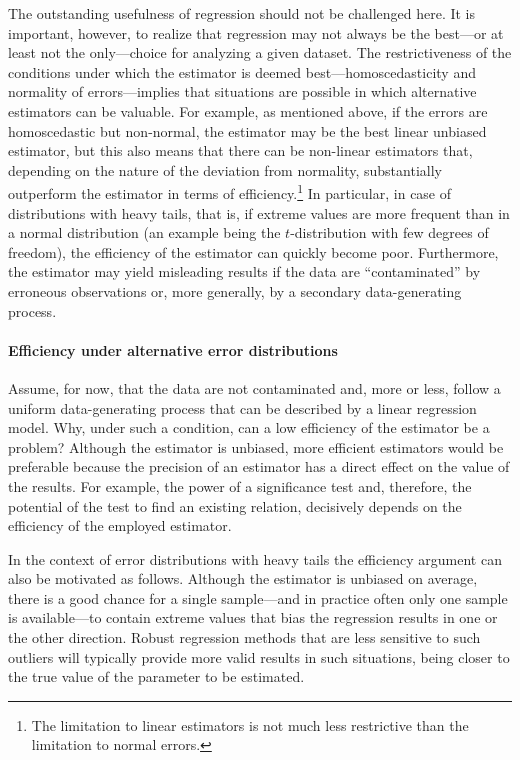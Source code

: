 The outstanding usefulness of  regression should not be challenged
here. It is important, however, to realize that  regression may not
always be the best---or at least not the only---choice for analyzing a given
dataset. The restrictiveness of the conditions under which the 
estimator is deemed best---homoscedasticity and normality of errors---implies
that situations are possible in which alternative estimators can be valuable.
For example, as mentioned above, if the errors are homoscedastic but
non-normal, the  estimator may be the best linear unbiased estimator,
but this also means that there can be non-linear estimators that, depending on
the nature of the deviation from normality, substantially outperform the
 estimator in terms of efficiency.\footnote{The limitation to linear
estimators is not much less restrictive than the limitation to normal errors.}
In particular, in case of distributions with heavy tails, that is, if extreme
values are more frequent than in a normal distribution (an example being the
$t$-distribution with few degrees of freedom), the efficiency of the 
estimator can quickly become poor. Furthermore, the  estimator may
yield misleading results if the data are “contaminated” by erroneous
observations or, more generally, by a secondary data-generating process.

\paragraph{Efficiency under alternative error distributions}

Assume, for now, that the data are not contaminated and, more or less, follow a
uniform data-generating process that can be described by a linear regression
model. Why, under such a condition, can a low efficiency of the 
estimator be a problem? Although the
 estimator is unbiased, more efficient estimators would be preferable
because the precision of an estimator has a direct effect on the value of the
results. For example, the power of a significance test and, therefore, the
potential of the test to find an existing relation, decisively depends on the
efficiency of the employed estimator.

In the context of error distributions with heavy tails the efficiency argument
can also be motivated as follows. Although the  estimator is unbiased
on average, there is a good chance for a single sample---and in practice often
only one sample is available---to contain extreme values that bias the
regression results in one or the other direction. Robust regression methods
that are less sensitive to such outliers will typically provide more valid
results in such situations, being closer to the true value of the parameter to
be estimated.

